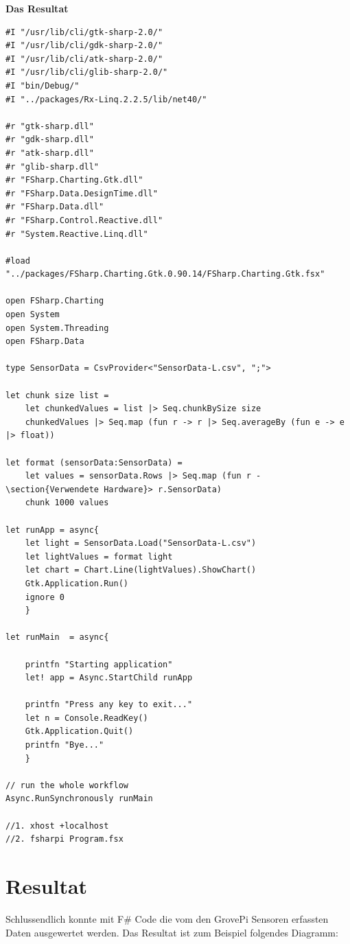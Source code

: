 \textbf{Das Resultat} \\
\begin{lstlisting}
#I "/usr/lib/cli/gtk-sharp-2.0/"
#I "/usr/lib/cli/gdk-sharp-2.0/"
#I "/usr/lib/cli/atk-sharp-2.0/"
#I "/usr/lib/cli/glib-sharp-2.0/"
#I "bin/Debug/"
#I "../packages/Rx-Linq.2.2.5/lib/net40/"

#r "gtk-sharp.dll"
#r "gdk-sharp.dll"
#r "atk-sharp.dll"
#r "glib-sharp.dll"
#r "FSharp.Charting.Gtk.dll"
#r "FSharp.Data.DesignTime.dll"
#r "FSharp.Data.dll"
#r "FSharp.Control.Reactive.dll"
#r "System.Reactive.Linq.dll"

#load "../packages/FSharp.Charting.Gtk.0.90.14/FSharp.Charting.Gtk.fsx"

open FSharp.Charting
open System
open System.Threading
open FSharp.Data

type SensorData = CsvProvider<"SensorData-L.csv", ";">

let chunk size list =
    let chunkedValues = list |> Seq.chunkBySize size
    chunkedValues |> Seq.map (fun r -> r |> Seq.averageBy (fun e -> e |> float))

let format (sensorData:SensorData) =
    let values = sensorData.Rows |> Seq.map (fun r -\section{Verwendete Hardware}> r.SensorData)
    chunk 1000 values

let runApp = async{
    let light = SensorData.Load("SensorData-L.csv")
    let lightValues = format light
    let chart = Chart.Line(lightValues).ShowChart()
    Gtk.Application.Run()
    ignore 0
    }

let runMain  = async{

    printfn "Starting application"
    let! app = Async.StartChild runApp

    printfn "Press any key to exit..."
    let n = Console.ReadKey()
    Gtk.Application.Quit()
    printfn "Bye..."
    }

// run the whole workflow
Async.RunSynchronously runMain  

//1. xhost +localhost
//2. fsharpi Program.fsx
\end{lstlisting}

\section{Resultat}
Schlussendlich konnte mit F\# Code die vom den GrovePi Sensoren erfassten Daten ausgewertet werden. Das Resultat ist zum Beispiel folgendes Diagramm:

